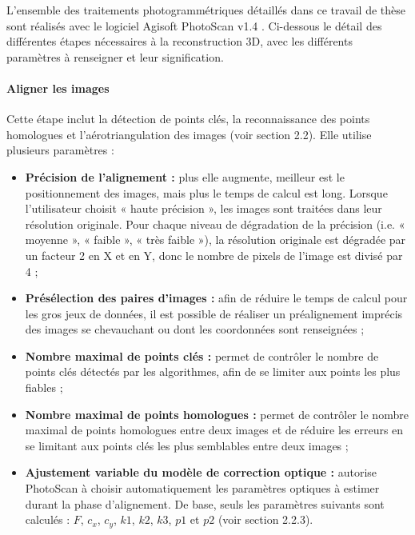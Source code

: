 L’ensemble des traitements photogrammétriques détaillés dans ce travail de thèse sont réalisés avec le logiciel Agisoft PhotoScan v1.4 \citep{agisoft_agisoft_2018-1}. Ci-dessous le détail des différentes étapes nécessaires à la reconstruction 3D, avec les différents paramètres à renseigner et leur signification.

\paragraph{Aligner les images}

Cette étape inclut la détection de points clés, la reconnaissance des points homologues et l’aérotriangulation des images (voir section 2.2). Elle utilise plusieurs paramètres :

\begin{itemize}
    \item \textbf{Précision de l’alignement :} plus elle augmente, meilleur est le positionnement des images, mais plus le temps de calcul est long. Lorsque l’utilisateur choisit « haute précision », les images sont traitées dans leur résolution originale. Pour chaque niveau de dégradation de la précision (i.e. « moyenne », « faible », « très faible »), la résolution originale est dégradée par un facteur 2 en X et en Y, donc le nombre de pixels de l’image est divisé par 4 ;
    
    \item \textbf{Présélection des paires d’images :} afin de réduire le temps de calcul pour les gros jeux de données, il est possible de réaliser un préalignement imprécis des images se chevauchant ou dont les coordonnées sont renseignées ;
    
    \item \textbf{Nombre maximal de points clés :} permet de contrôler le nombre de points clés détectés par les algorithmes, afin de se limiter aux points les plus fiables ;
    
    \item \textbf{Nombre maximal de points homologues :} permet de contrôler le nombre maximal de points homologues entre deux images et de réduire les erreurs en se limitant aux points clés les plus semblables entre deux images ;
    
    \item \textbf{Ajustement variable du modèle de correction optique :} autorise PhotoScan à choisir automatiquement les paramètres optiques à estimer durant la phase d’alignement. De base, seuls les paramètres suivants sont calculés : $F$, $c_x$, $c_y$, $k1$, $k2$, $k3$, $p1$ et $p2$ (voir section 2.2.3).
\end{itemize}

